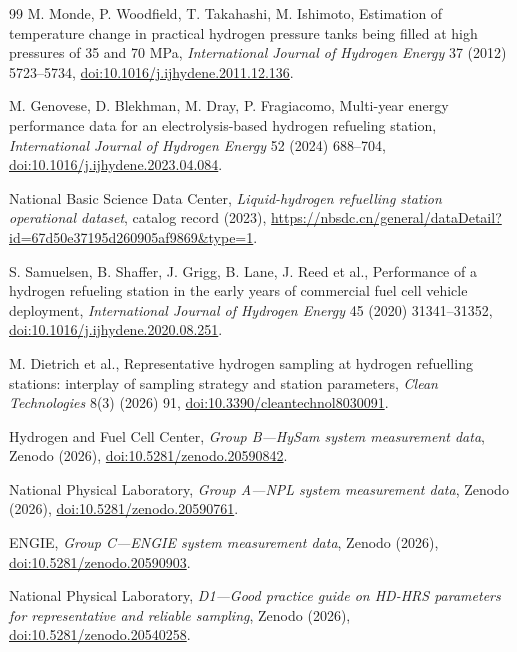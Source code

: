 \documentclass[12pt,a4paper]{article}
\begin{document}
\begin{thebibliography}{99}
M. Monde, P. Woodfield, T. Takahashi, M. Ishimoto, Estimation of temperature
change in practical hydrogen pressure tanks being filled at high pressures of
35 and 70 MPa, \textit{International Journal of Hydrogen Energy} 37 (2012)
5723--5734,
\href{https://doi.org/10.1016/j.ijhydene.2011.12.136}{doi:10.1016/j.ijhydene.2011.12.136}.

M. Genovese, D. Blekhman, M. Dray, P. Fragiacomo, Multi-year energy
performance data for an electrolysis-based hydrogen refueling station,
\textit{International Journal of Hydrogen Energy} 52 (2024) 688--704,
\href{https://doi.org/10.1016/j.ijhydene.2023.04.084}{doi:10.1016/j.ijhydene.2023.04.084}.

National Basic Science Data Center, \textit{Liquid-hydrogen refuelling station
operational dataset}, catalog record (2023),
\url{https://nbsdc.cn/general/dataDetail?id=67d50e37195d260905af9869\&type=1}.

S. Samuelsen, B. Shaffer, J. Grigg, B. Lane, J. Reed et al., Performance of a
hydrogen refueling station in the early years of commercial fuel cell vehicle
deployment, \textit{International Journal of Hydrogen Energy} 45 (2020)
31341--31352,
\href{https://doi.org/10.1016/j.ijhydene.2020.08.251}{doi:10.1016/j.ijhydene.2020.08.251}.

M. Dietrich et al., Representative hydrogen sampling at hydrogen refuelling
stations: interplay of sampling strategy and station parameters,
\textit{Clean Technologies} 8(3) (2026) 91,
\href{https://doi.org/10.3390/cleantechnol8030091}{doi:10.3390/cleantechnol8030091}.

Hydrogen and Fuel Cell Center, \textit{Group B---HySam system measurement data},
Zenodo (2026),
\href{https://doi.org/10.5281/zenodo.20590842}{doi:10.5281/zenodo.20590842}.

National Physical Laboratory, \textit{Group A---NPL system measurement data},
Zenodo (2026),
\href{https://doi.org/10.5281/zenodo.20590761}{doi:10.5281/zenodo.20590761}.

ENGIE, \textit{Group C---ENGIE system measurement data}, Zenodo (2026),
\href{https://doi.org/10.5281/zenodo.20590903}{doi:10.5281/zenodo.20590903}.

National Physical Laboratory, \textit{D1---Good practice guide on HD-HRS
parameters for representative and reliable sampling}, Zenodo (2026),
\href{https://doi.org/10.5281/zenodo.20540258}{doi:10.5281/zenodo.20540258}.


\end{thebibliography}
\end{document}
